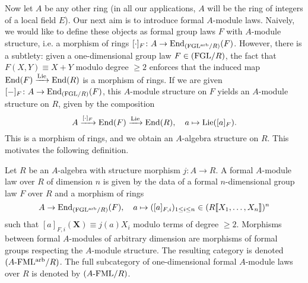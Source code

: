 \documentclass[../main.tex]{subfiles}
\begin{document}
Now let $A$ be any other ring (in all our applications, $A$ will be the ring
of integers of a local field $E$). Our next aim is to introduce formal $A$-module
laws. Naively, we would like to define these objects as formal group laws $F$
with $A$-module structure, i.e. a morphism of rings $[\cdot]_F\colon A \to
\operatorname{End}_{(\mathrm{FGL^{arb}}/{R})}(F)$. However, there is a subtlety: given a one-dimensional
group law $F \in {(\mathrm{FGL}/{R})}$, the fact that $F(X,Y) \equiv X+Y$ modulo degree $\geq 2$
enforces that the induced map $\operatorname{End}(F) \xrightarrow{\operatorname{Lie}} \operatorname{End}(R)$ is a morphism of rings. 
If we are given $[-]_F\colon  A \to \operatorname{End}_{{(\mathrm{FGL}/{R})}}(F)$, this $A$-module structure on $F$ 
yields an $A$-module structure on $R$, given by the composition
\begin{equation*}
  A \xrightarrow{[\cdot]_F} \operatorname{End}(F) \xrightarrow{\operatorname{Lie}} \operatorname{End}(R), \quad a \mapsto \operatorname{Lie}([a]_F).
\end{equation*}
This is a morphism of rings, and we obtain an $A$-algebra structure on $R$. 
This motivates the following definition.
\begin{defi}\label{def:formalmodulelaw}
  Let $R$ be an $A$-algebra with structure morphism $j\colon  A \to R$. A formal
  $A$-module law over $R$ of dimension $n$ is given by the data of 
  a formal $n$-dimensional group law $F$ over $R$ and a morphism of rings
  \begin{equation*}
    A \to \operatorname{End}_{{(\mathrm{FGL^{arb}}/{R})}} (F), \quad a \mapsto ([a]_{F,i}
    )_{1 \leq i \leq n} \in (R \llbracket X_1, \dots, X_n \rrbracket )^n
  \end{equation*}
  such that $[a]_{F,i}(\mathbf X) \equiv j(a) X_i$ modulo terms of degree 
  $\geq 2$. Morphisms between formal $A$-modules of arbitrary dimension are 
  morphisms of formal groups respecting the $A$-module structure. 
  The resulting category is denoted ${({A}\textnormal-\allowbreak\mathrm{FML^{arb}}/{R})}$. The full
  subcategory of one-dimensional formal $A$-module laws over $R$ is denoted 
  by ${({A}\textnormal-\allowbreak\mathrm{FML}/{R})}$.
\end{defi}
\end{document}
